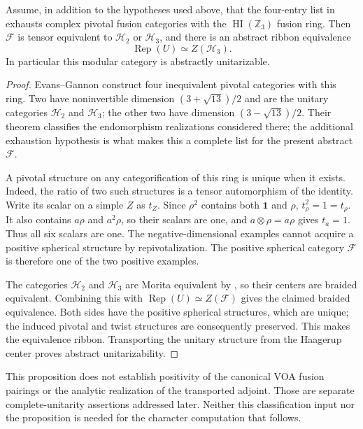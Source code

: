 \begin{proposition}
\label{prop:optional-algebraic-identification}
Assume, in addition to the hypotheses used above, that the four-entry
list in \cite[Table~9.1]{Vercleyen} exhausts complex pivotal fusion
categories with the $\operatorname{HI}(\mathbb Z_3)$ fusion ring. Then
$\mathcal F$ is tensor equivalent to $\mathcal H_2$ or $\mathcal H_3$,
and there is an abstract ribbon equivalence
\[
 \operatorname{Rep}(U)\simeq Z(\mathcal H_3).
\]
In particular this modular category is abstractly unitarizable.
\end{proposition}
\begin{proof}
Evans--Gannon \cite[Theorem~3(ii)]{EG15} construct four inequivalent
pivotal categories with this ring. Two have noninvertible dimension
$(3+\sqrt{13})/2$ and are the unitary categories $\mathcal H_2$ and
$\mathcal H_3$; the other two have dimension $(3-\sqrt{13})/2$.
Their theorem classifies the endomorphism realizations considered
there; the additional exhaustion hypothesis is what makes this a
complete list for the present abstract $\mathcal F$.

A pivotal structure on any categorification of this ring is unique
when it exists. Indeed, the ratio of two such structures is a tensor
automorphism of the identity. Write its scalar on a simple $Z$ as
$t_Z$. Since $\rho^2$ contains both $\mathbf1$ and $\rho$,
$t_\rho^2=1=t_\rho$. It also contains $a\rho$ and $a^2\rho$,
so their scalars are one, and $a\otimes\rho=a\rho$ gives $t_a=1$.
Thus all six scalars are one. The negative-dimensional examples
cannot acquire a positive spherical structure by repivotalization.
The positive spherical category $\mathcal F$ is therefore one of the
two positive examples.

The categories $\mathcal H_2$ and $\mathcal H_3$ are Morita equivalent
by \cite[Theorem~1.4]{GS}, so their centers are braided equivalent.
Combining this with $\operatorname{Rep}(U)\simeq Z(\mathcal F)$ gives
the claimed braided equivalence. Both sides have the positive
spherical structures, which are unique; the induced pivotal and
twist structures are consequently preserved. This makes the
equivalence ribbon. Transporting the unitary structure from the
Haagerup center proves abstract unitarizability.
\end{proof}

This proposition does not establish positivity of the canonical VOA
fusion pairings or the analytic realization of the transported adjoint.
Those are separate complete-unitarity assertions addressed later.
Neither this classification input nor the proposition is needed for
the character computation that follows.

